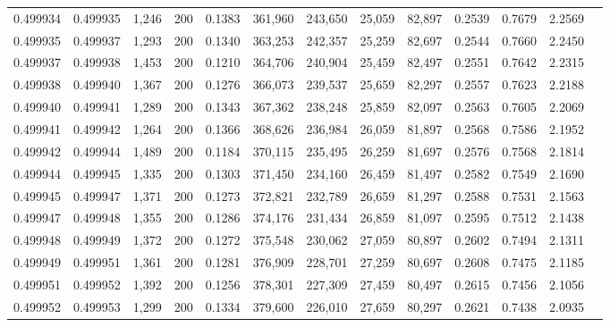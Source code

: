 \begin{tabular}{rrrrrrrrrrrrr}
0.499934 & 0.499935 &  1,246 & 200 &                                     0.1383 & 361,960 & 243,650 &  25,059 &  82,897 & 0.2539 & 0.7679 & 2.2569 \\
0.499935 & 0.499937 &  1,293 & 200 &                                     0.1340 & 363,253 & 242,357 &  25,259 &  82,697 & 0.2544 & 0.7660 & 2.2450 \\
0.499937 & 0.499938 &  1,453 & 200 &                                     0.1210 & 364,706 & 240,904 &  25,459 &  82,497 & 0.2551 & 0.7642 & 2.2315 \\
0.499938 & 0.499940 &  1,367 & 200 &                                     0.1276 & 366,073 & 239,537 &  25,659 &  82,297 & 0.2557 & 0.7623 & 2.2188 \\
0.499940 & 0.499941 &  1,289 & 200 &                                     0.1343 & 367,362 & 238,248 &  25,859 &  82,097 & 0.2563 & 0.7605 & 2.2069 \\
0.499941 & 0.499942 &  1,264 & 200 &                                     0.1366 & 368,626 & 236,984 &  26,059 &  81,897 & 0.2568 & 0.7586 & 2.1952 \\
0.499942 & 0.499944 &  1,489 & 200 &                                     0.1184 & 370,115 & 235,495 &  26,259 &  81,697 & 0.2576 & 0.7568 & 2.1814 \\
0.499944 & 0.499945 &  1,335 & 200 &                                     0.1303 & 371,450 & 234,160 &  26,459 &  81,497 & 0.2582 & 0.7549 & 2.1690 \\
0.499945 & 0.499947 &  1,371 & 200 &                                     0.1273 & 372,821 & 232,789 &  26,659 &  81,297 & 0.2588 & 0.7531 & 2.1563 \\
0.499947 & 0.499948 &  1,355 & 200 &                                     0.1286 & 374,176 & 231,434 &  26,859 &  81,097 & 0.2595 & 0.7512 & 2.1438 \\
0.499948 & 0.499949 &  1,372 & 200 &                                     0.1272 & 375,548 & 230,062 &  27,059 &  80,897 & 0.2602 & 0.7494 & 2.1311 \\
0.499949 & 0.499951 &  1,361 & 200 &                                     0.1281 & 376,909 & 228,701 &  27,259 &  80,697 & 0.2608 & 0.7475 & 2.1185 \\
0.499951 & 0.499952 &  1,392 & 200 &                                     0.1256 & 378,301 & 227,309 &  27,459 &  80,497 & 0.2615 & 0.7456 & 2.1056 \\
0.499952 & 0.499953 &  1,299 & 200 &                                     0.1334 & 379,600 & 226,010 &  27,659 &  80,297 & 0.2621 & 0.7438 & 2.0935 \\

\end{tabular}
